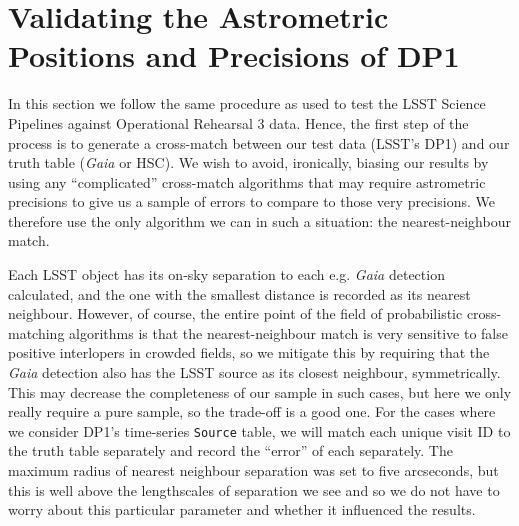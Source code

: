 \documentclass[SE,lsstdraft,authoryear,toc]{lsstdoc}
\begin{document}
\section{Validating the Astrometric Positions and Precisions of DP1}
\label{sec:validating-positions-precisions}
In this section we follow the same procedure as \citet{sitcomtn-159} used to test the LSST Science Pipelines against Operational Rehearsal 3 data.
Hence, the first step of the process is to generate a cross-match between our test data (LSST's DP1) and our truth table (\textit{Gaia} or HSC).
We wish to avoid, ironically, biasing our results by using any ``complicated'' cross-match algorithms that may require astrometric precisions to give us a sample of errors to compare to those very precisions.
We therefore use the only algorithm we can in such a situation: the nearest-neighbour match.

Each LSST object has its on-sky separation to each e.g. \textit{Gaia} detection calculated, and the one with the smallest distance is recorded as its nearest neighbour.
However, of course, the entire point of the field of probabilistic cross-matching algorithms is that the nearest-neighbour match is very sensitive to false positive interlopers in crowded fields, so we mitigate this by requiring that the \textit{Gaia} detection also has the LSST source as its closest neighbour, symmetrically.
This may decrease the completeness of our sample in such cases, but here we only really require a pure sample, so the trade-off is a good one.
For the cases where we consider DP1's time-series \texttt{Source} table, we will match each unique visit ID to the truth table separately and record the ``error'' of each separately.
The maximum radius of nearest neighbour separation was set to five arcseconds, but this is well above the lengthscales of separation we see and so we do not have to worry about this particular parameter and whether it influenced the results.
\end{document}
